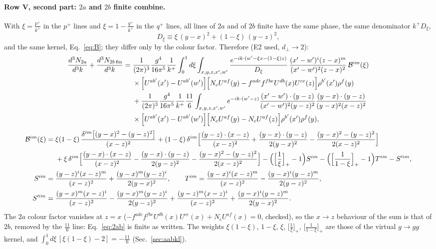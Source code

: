 \documentclass[10pt]{article}
\numberwithin{equation}{section}
\begin{document}
\paragraph{Row V, second part: $2a$ and $2b$ finite combine.} With $\xi=\frac{p^+}{k^+}$ in the $p^+$ lines and $\xi=1-\frac{q^+}{k^+}$ in the $q^+$ lines, all lines of $2a$ and of $2b$ finite have the same phase, the same denominator $k^+D_\xi$,
\begin{equation}
D_\xi\equiv\xi\,(y-x)^2+(1-\xi)\,(y-z)^2,
\end{equation}
and the same kernel, Eq.~\eqref{eq:B}; they differ only by the colour factor. Therefore (E2 used, $d_\perp\to2$):
\begin{align}
\frac{d^3N_{2a}}{d^3k}+\frac{d^3N_{2b\,\rm fin}}{d^3k}={}&\frac{1}{(2\pi)^3}\frac{g^4}{16\pi^5}\frac1{k^+}\int_0^1d\xi\int_{x,y,z,x',w'}\frac{e^{-ik\cdot(w'-\xi x-(1-\xi)z)}}{D_\xi}\,\frac{(x'-w')^{i}(z-x)^{m}}{(x'-w')^{2}(z-x)^{2}}\,\mathcal B^{im}(\xi)\notag\\
&\times\Big[U^{ab'}(x')-U^{ab'}(w')\Big]\Big[N_cU^{af}(y)-f^{adc}f^{fbe}U^{db}(x)U^{ce}(z)\Big]\rho^{b'}(x')\rho^f(y)\notag\\
&+\frac{1}{(2\pi)^{3}}\frac{g^{4}}{16\pi^{5}}\frac{1}{k^{+}}\frac{11}{6}\int_{x,y,z,x',w'}e^{-ik\cdot(w'-z)}\frac{(x'-w')\cdot(y-z)}{(x'-w')^{2}(y-z)^{2}}\frac{(y-x)\cdot(y-z)}{(y-x)^{2}(x-z)^{2}}\notag\\
&\times\Big[U^{ab'}(x')-U^{ab'}(w')\Big]\Big[N_cU^{af}(y)-N_cU^{af}(z)\Big]\rho^{b'}(x')\rho^{f}(y),\label{eq:2ab}
\end{align}
\begin{align}
\mathcal B^{im}(\xi)={}&\xi(1-\xi)\,\frac{\delta^{im}\big[(y-x)^2-(y-z)^2\big]}{(x-z)^2}+(1-\xi)\,\delta^{im}\Big[\frac{(y-z)\cdot(x-z)}{(x-z)^{2}}+\frac{(y-x)\cdot(y-z)}{2(y-x)^{2}}-\frac{(y-x)^{2}-(y-z)^{2}}{2(x-z)^{2}}\Big]\notag\\
&+\xi\,\delta^{im}\Big[\frac{(y-x)\cdot(x-z)}{(x-z)^{2}}-\frac{(y-x)\cdot(y-z)}{2(y-z)^{2}}-\frac{(y-x)^{2}-(y-z)^{2}}{2(x-z)^{2}}\Big]-\Big(\Big[\frac1\xi\Big]_+-1\Big)S^{im}-\Big(\Big[\frac{1}{1-\xi}\Big]_+-1\Big)T^{im}-S'^{im},\label{eq:B}\\
S^{im}={}&\frac{(y-z)^{i}(x-z)^{m}}{(x-z)^{2}}+\frac{(y-x)^{m}(y-z)^{i}}{2(y-x)^{2}},\qquad T^{im}=\frac{(y-x)^{i}(x-z)^{m}}{(x-z)^{2}}-\frac{(y-x)^{i}(y-z)^{m}}{2(y-z)^{2}},\notag\\
S'^{im}={}&\frac{(y-x)^{m}(x-z)^{i}}{(x-z)^{2}}-\frac{(y-x)^{m}(y-z)^{i}}{2(y-z)^{2}}+\frac{(y-z)^{m}(x-z)^{i}}{(x-z)^{2}}+\frac{(y-x)^{i}(y-z)^{m}}{2(y-x)^{2}}.\notag
\end{align}
The $2a$ colour factor vanishes at $z=x$ ($-f^{adc}f^{fbe}U^{db}(x)U^{ce}(x)+N_cU^{af}(x)=0$, checked), so the $x\to z$ behaviour of the sum is that of $2b$, removed by the $\frac{11}{6}$ line: Eq.~\eqref{eq:2ab} is finite as written. The weights $\xi(1-\xi)$, $1-\xi$, $\xi$, $\big[\frac1\xi\big]_+$, $\big[\frac1{1-\xi}\big]_+$ are those of the virtual $g\to gg$ kernel, and $\int_0^1d\xi\,[\xi(1-\xi)-2]=-\frac{11}{6}$ (Sec.~\ref{sec:aabkl}).
\end{document}
